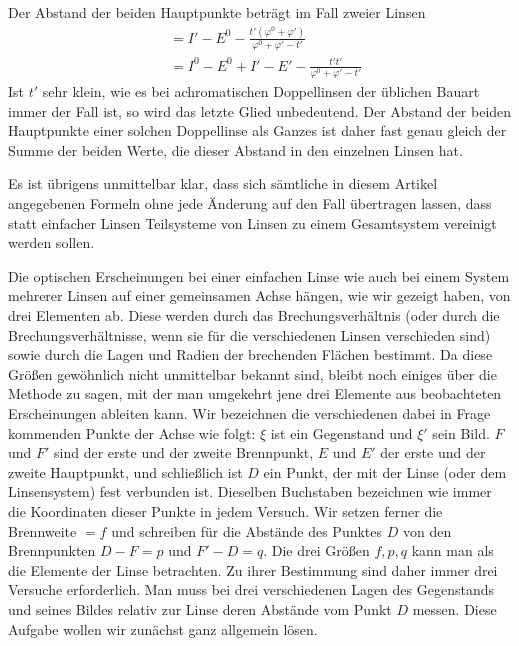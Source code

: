 Der Abstand der beiden Hauptpunkte beträgt im Fall zweier Linsen
\[
\begin{aligned}
&=I'-E^0-\frac{t'(\varphi^0+\varphi')}{\varphi^0+\varphi'-t'}\\
&=I^0-E^0+I'-E'-\frac{t't'}{\varphi^0+\varphi'-t'}
\end{aligned}
\]
Ist $t'$ sehr klein, wie es bei achromatischen Doppellinsen der üblichen Bauart immer der Fall ist, so wird das letzte Glied unbedeutend. Der Abstand der beiden Hauptpunkte einer solchen Doppellinse als Ganzes ist daher fast genau gleich der Summe der beiden Werte, die dieser Abstand in den einzelnen Linsen hat.

Es ist übrigens unmittelbar klar, dass sich sämtliche in diesem Artikel angegebenen Formeln ohne jede Änderung auf den Fall übertragen lassen, dass statt einfacher Linsen Teilsysteme von Linsen zu einem Gesamtsystem vereinigt werden sollen.

Die optischen Erscheinungen bei einer einfachen Linse wie auch bei einem System mehrerer Linsen auf einer gemeinsamen Achse hängen, wie wir gezeigt haben, von drei Elementen ab. Diese werden durch das Brechungsverhältnis (oder durch die Brechungsverhältnisse, wenn sie für die verschiedenen Linsen verschieden sind) sowie durch die Lagen und Radien der brechenden Flächen bestimmt. Da diese Größen gewöhnlich nicht unmittelbar bekannt sind, bleibt noch einiges über die Methode zu sagen, mit der man umgekehrt jene drei Elemente aus beobachteten Erscheinungen ableiten kann. Wir bezeichnen die verschiedenen dabei in Frage kommenden Punkte der Achse wie folgt:
$\xi$ ist ein Gegenstand und $\xi'$ sein Bild. $F$ und $F'$ sind der erste und der zweite Brennpunkt, $E$ und $E'$ der erste und der zweite Hauptpunkt, und schließlich ist $D$ ein Punkt, der mit der Linse (oder dem Linsensystem) fest verbunden ist. Dieselben Buchstaben bezeichnen wie immer die Koordinaten dieser Punkte in jedem Versuch. Wir setzen ferner die Brennweite $=f$ und schreiben für die Abstände des Punktes $D$ von den Brennpunkten $D-F=p$ und $F'-D=q$. Die drei Größen $f,p,q$ kann man als die Elemente der Linse betrachten. Zu ihrer Bestimmung sind daher immer drei Versuche erforderlich. Man muss bei drei verschiedenen Lagen des Gegenstands und seines Bildes relativ zur Linse deren Abstände vom Punkt $D$ messen. Diese Aufgabe wollen wir zunächst ganz allgemein lösen.

